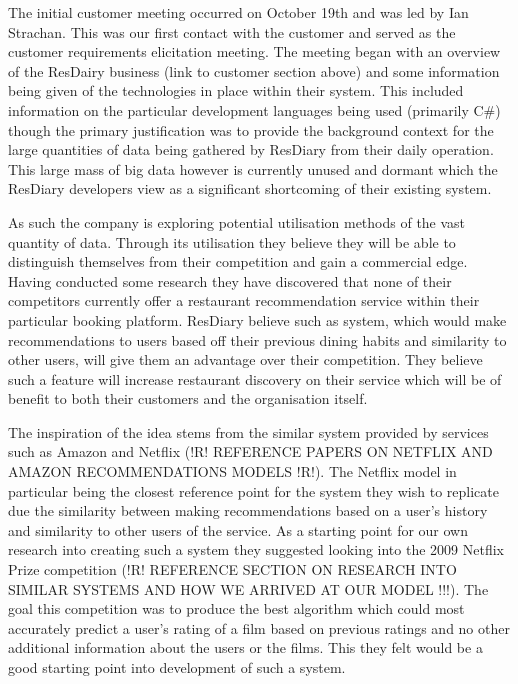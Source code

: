 \documentclass{l3proj}
\begin{document}



The initial customer meeting occurred on October 19th and was led by Ian Strachan. This was our first contact with the customer and served as the customer requirements elicitation meeting. The meeting began with an overview of the ResDairy business (link to customer section above) and some information being given of the technologies in place within their system. This included information on the particular development languages being used (primarily C\#) though the primary justification was to provide the background context for the large quantities of data being gathered by ResDiary from their daily operation. This large mass of big data however is currently unused and dormant which the ResDiary developers view as a significant shortcoming of their existing system. 

As such the company is exploring potential utilisation methods of the vast quantity of data. Through its utilisation they believe they will be able to distinguish themselves from their competition and gain a commercial edge. Having conducted some research they have discovered that none of their competitors currently offer a restaurant recommendation service within their particular booking platform. ResDiary believe such as system, which would make recommendations to users based off their previous dining habits and similarity to other users, will give them an advantage over their competition. They believe such a feature will increase restaurant discovery on their service which will be of benefit to both their customers and the organisation itself.

The inspiration of the idea stems from the similar system provided by services such as Amazon and Netflix (!R! REFERENCE PAPERS ON NETFLIX AND AMAZON RECOMMENDATIONS MODELS !R!). The Netflix model in particular being the closest reference point for the system they wish to replicate due the similarity between making recommendations based on a user’s history and similarity to other users of the service. As a starting point for our own research into creating such a system they suggested looking into the 2009 Netflix Prize competition (!R! REFERENCE SECTION ON RESEARCH INTO SIMILAR SYSTEMS AND HOW WE ARRIVED AT OUR MODEL !!!). The goal this competition was to produce the best algorithm which could most accurately predict a user’s rating of a film based on previous ratings and no other additional information about the users or the films. This they felt would be a good starting point into development of such a system.
\end{document}
